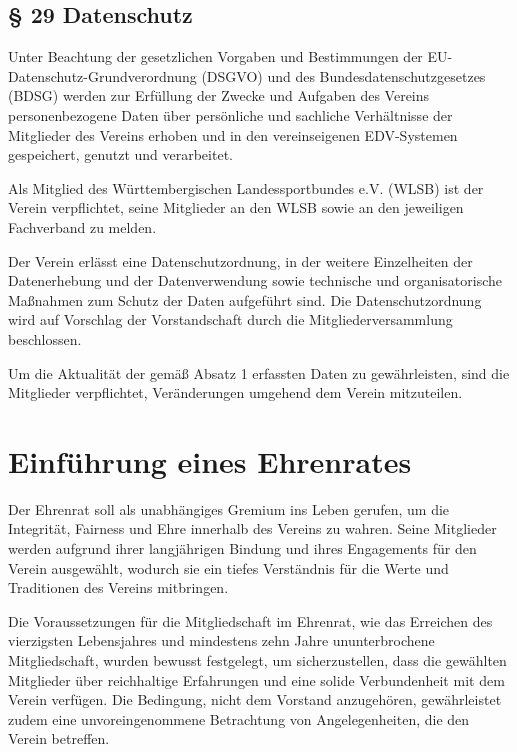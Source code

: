 \documentclass[10pt,a4paper,parskip=half]{scrartcl}
\newcommand{\change}[1]{
  \begin{adjustwidth}{20pt}{20pt}
    #1
  \end{adjustwidth}
}
\begin{document}
  \change{
    \subsection*{§ 29 Datenschutz}

    Unter Beachtung der gesetzlichen Vorgaben und Bestimmungen der EU\--Daten\-schutz\--Grund\-verordnung (DSGVO) und des Bundes\-datenschutz\-gesetzes (BDSG) werden zur Erfüllung der Zwecke und Aufgaben des Vereins personenbezogene Daten über persönliche und sachliche Verhältnisse der Mitglieder des Vereins erhoben und in den vereinseigenen EDV-Systemen gespeichert, genutzt und verarbeitet.

    Als Mitglied des Württembergischen Landessportbundes e.V. (WLSB) ist der Verein verpflichtet, seine Mitglieder an den WLSB sowie an den jeweiligen Fachverband zu melden.
    
    Der Verein erlässt eine Datenschutzordnung, in der weitere Einzelheiten der Datenerhebung und der Datenverwendung sowie technische und organisatorische Maßnahmen zum Schutz der Daten aufgeführt sind. Die Datenschutzordnung wird auf Vorschlag der Vorstandschaft durch die Mitgliederversammlung beschlossen.
    
    Um die Aktualität der gemäß Absatz 1 erfassten Daten zu gewährleisten,
    sind die Mitglieder verpflichtet, Veränderungen umgehend dem Verein mitzuteilen.
  }

  \section{Einführung eines Ehrenrates}
  Der Ehrenrat soll als unabhängiges Gremium ins Leben gerufen, um die Integrität, Fairness und Ehre innerhalb des Vereins zu wahren. Seine Mitglieder werden aufgrund ihrer langjährigen Bindung und ihres Engagements für den Verein ausgewählt, wodurch sie ein tiefes Verständnis für die Werte und Traditionen des Vereins mitbringen.

  Die Voraussetzungen für die Mitgliedschaft im Ehrenrat, wie das Erreichen des vierzigsten Lebensjahres und mindestens zehn Jahre ununterbrochene Mitgliedschaft, wurden bewusst festgelegt, um sicherzustellen, dass die gewählten Mitglieder über reichhaltige Erfahrungen und eine solide Verbundenheit mit dem Verein verfügen. Die Bedingung, nicht dem Vorstand anzugehören, gewährleistet zudem eine unvoreingenommene Betrachtung von Angelegenheiten, die den Verein betreffen.
\end{document}
